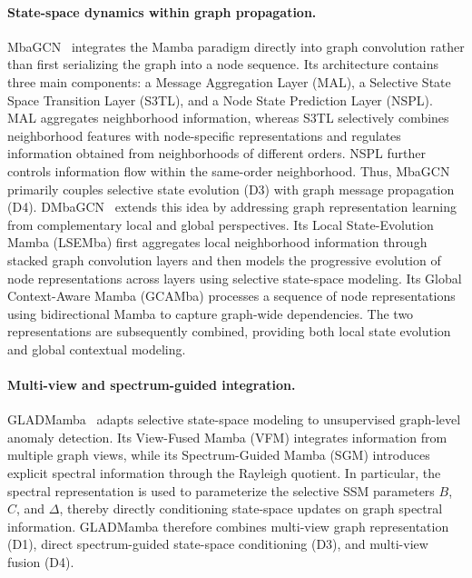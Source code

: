 \documentclass[acmsmall]{acmart}
\begin{document}
\paragraph{\textbf{State-space dynamics within graph propagation.}}
MbaGCN~\cite{he2025mamba} integrates the Mamba paradigm directly into graph
convolution rather than first serializing the graph into a node sequence. Its
architecture contains three main components: a Message Aggregation Layer
(MAL), a Selective State Space Transition Layer (S3TL), and a Node State
Prediction Layer (NSPL). MAL aggregates neighborhood information, whereas
S3TL selectively combines neighborhood features with node-specific
representations and regulates information obtained from neighborhoods of
different orders. NSPL further controls information flow within the same-order
neighborhood. Thus, MbaGCN primarily couples selective state evolution (D3)
with graph message propagation (D4).
DMbaGCN~\cite{he2026dual} extends this idea by addressing graph
representation learning from complementary local and global perspectives. Its
Local State-Evolution Mamba (LSEMba) first aggregates local neighborhood
information through stacked graph convolution layers and then models the
progressive evolution of node representations across layers using selective
state-space modeling. Its Global Context-Aware Mamba (GCAMba) processes a
sequence of node representations using bidirectional Mamba to capture
graph-wide dependencies. The two representations are subsequently combined,
providing both local state evolution and global contextual modeling.

\paragraph{\textbf{Multi-view and spectrum-guided integration.}}
GLADMamba~\cite{fu2025gladmamba} adapts selective state-space modeling to
unsupervised graph-level anomaly detection. Its View-Fused Mamba (VFM)
integrates information from multiple graph views, while its Spectrum-Guided
Mamba (SGM) introduces explicit spectral information through the Rayleigh
quotient. In particular, the spectral representation is used to parameterize
the selective SSM parameters $B$, $C$, and $\Delta$, thereby directly
conditioning state-space updates on graph spectral information. GLADMamba
therefore combines multi-view graph representation (D1), direct
spectrum-guided state-space conditioning (D3), and multi-view fusion (D4).
\end{document}
